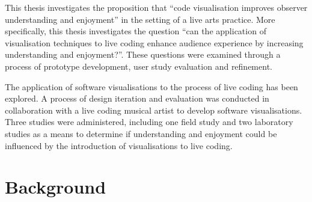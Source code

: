 This thesis investigates the proposition that ``code visualisation improves observer understanding and enjoyment'' in the setting of a live arts practice. More specifically, this thesis investigates the question ``can the application of visualisation techniques to live coding enhance audience experience by increasing understanding and enjoyment?''. These questions were examined through a process of prototype development, user study evaluation and refinement.

The application of software visualisations to the process of live coding has been explored. A process of design iteration and evaluation was conducted in collaboration with a live coding musical artist to develop software visualisations. Three studies were administered, including one field study and two laboratory studies as a means to determine if understanding and enjoyment could be influenced by the introduction of visualisations to live coding.


\section{Background}






